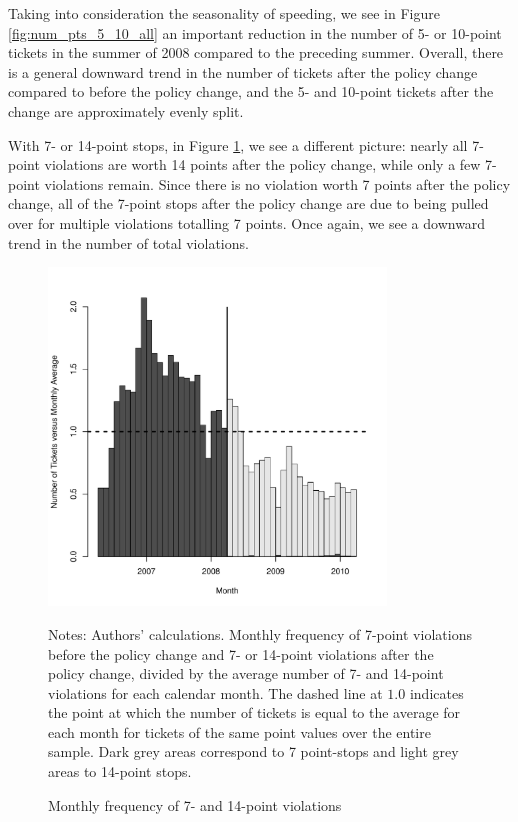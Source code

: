 Taking into consideration the seasonality of speeding, we see 
in Figure \ref{fig:num_pts_5_10_all}
an important reduction in the number of 5- or 10-point tickets 
in the summer of 2008 compared to the preceding summer. 
Overall, there is a general downward trend in the number of tickets 
after the policy change compared to before the policy change, 
and the 5- and 10-point tickets after the change are approximately evenly split. 

With 7- or 14-point stops,
in Figure \ref{fig:num_pts_7_14_all}, 
we see a different picture: 
nearly all 7-point violations are worth 14 points after the policy change, 
while only a few 7-point violations remain. 
Since there is no violation worth 7 points after the policy change, 
all of the 7-point stops after the policy change are due to being pulled over 
for multiple violations totalling 7 points. 
Once again, we see a downward trend in the number of total violations. 


\begin{figure}
\centering
\includegraphics[width=0.8\textwidth]{Figures/num_pts_7_14_all}
\caption{Monthly frequency of 7- and 14-point violations }
Notes: Authors' calculations. 
Monthly frequency of 7-point violations before the policy change 
and 7- or 14-point violations after the policy change, 
divided by the average number of 7- and 14-point violations
for each calendar month. 
% 
The dashed line at $1.0$ indicates the point at which 
the number of tickets is equal to the average for each month 
for tickets of the same point values over the entire sample.
% 
Dark grey areas correspond to 7 point-stops and light grey areas to 14-point stops.
\label{fig:num_pts_7_14_all}
\end{figure}


